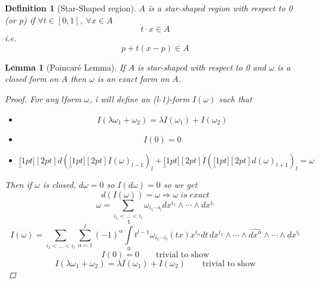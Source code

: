 \documentclass[12pt]{article}
\newtheorem{lemma}[theorem]{Lemma}
\newtheorem{definition}{Definition}[section]
\begin{document}
\begin{definition}[Star-Shaped region]  
$A$ is a star-shaped region with respect to 0 (or p) if  $\forall t \in [0,1], \; \forall x \in A$
 \[t\cdot x \in A\]
i.e.\[p +t(x-p) \in A\]
\end{definition}

\begin{lemma}[Poincaré Lemma]
If $A$ is star-shaped with respect to 0 and $\omega$ is a closed form on $A$ then $\omega$ is an exact form on $A$. 
\begin{proof}
For any $l$form $\omega$, i will define an (l-1)-form $I(\omega)$ such that 
\begin{itemize}
\item \[I(\lambda\omega_1 + \omega_2) = \lambda I(\omega_1) + I(\omega_2)\]
\item \[I(0) =0\]
\item \[\underbracket[1pt][2pt]{d(\underbracket[1pt][2pt]{I(\omega)}_{l-1})}_{l} +\underbracket[1pt][2pt]{I(\underbracket[1pt][2pt]{d(\omega)}_{l+1})}_{l} = \omega\]
\end{itemize}
Then if $\omega$ is closed, $d\omega =0$ so $I(d\omega)=0$ so we get 
\[d(I(\omega)) = \omega \Rightarrow \omega \; is \; exact\]
\[\omega = \sum\limits_{i_1<\dots <i_l}\omega_{i_1\cdots i_l}dx^{i_1}\wedge\cdots\wedge dx^{i_l}\]
\[I(\omega) = \sum\limits_{i_1<\dots <i_l}\sum\limits_{\alpha=1}^{l}(-1)^\alpha\int\limits_{0}^1 t^{l-1}\omega_{i_1\cdots i_l}(tx)x^{i_\alpha}dt\, dx^{i_1}\wedge\cdots\wedge \hat{dx^{\alpha}}\wedge\cdots\wedge dx^{i_l}\]
\[I(0)=0 \qquad \text{trivial to show}\]
\[I(\lambda\omega_1 + \omega_2) = \lambda I(\omega_1) + I(\omega_2) \qquad \text{trivial to show}\]
\end{proof}
\end{lemma}
\end{document}
